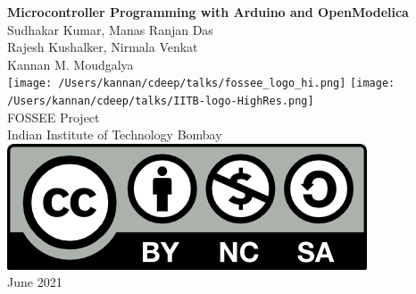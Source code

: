 \begin{center}
{\bf {\Huge Microcontroller Programming with Arduino and OpenModelica}}
\vfill
%
Sudhakar Kumar, Manas Ranjan Das \\
Rajesh Kushalker, Nirmala Venkat \\
Kannan M. Moudgalya \\
\vfill
\texttt{[image: /Users/kannan/cdeep/talks/fossee\_logo\_hi.png]} \quad
\texttt{[image: /Users/kannan/cdeep/talks/IITB-logo-HighRes.png]} \\
FOSSEE Project \\
Indian Institute of Technology Bombay \\ [2mm]
\includegraphics[width=0.15\linewidth]{by-nc-sa.png} \\ [1mm]
June 2021
\end{center}

\clearpage
